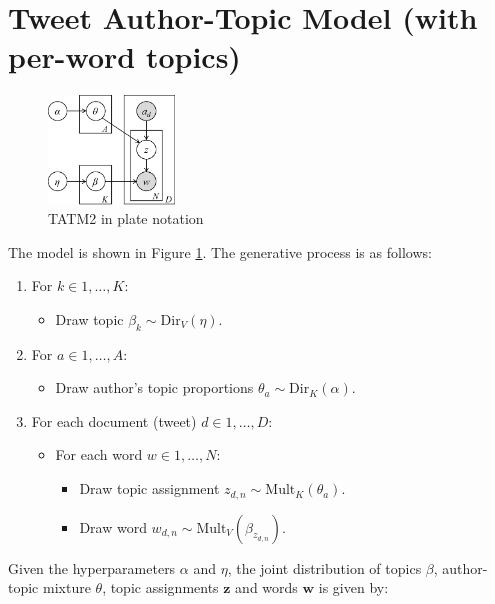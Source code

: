 \section{Tweet Author-Topic Model (with per-word topics)}

\begin{figure}[tb]
    \centering
    \includegraphics[width=0.3\textwidth]{TATM2.eps}
    \caption{TATM2 in plate notation}
    \label{fig:TATM2}
\end{figure}

The model is shown in Figure \ref{fig:TATM2}. The generative process is as follows:

\begin{enumerate}
	\item For $k \in {1, \ldots, K}$:
	\begin{itemize}
		\item Draw topic $\beta_k \sim \text{Dir}_V(\eta)$.
	\end{itemize}
	\item For $a \in {1, \ldots, A}$:
	\begin{itemize}
		\item Draw author's topic proportions $\theta_a \sim \text{Dir}_K(\alpha)$.
	\end{itemize}
  \item For each document (tweet) $d \in {1, \ldots, D}$:
	\begin{itemize}
		\item For each word $w \in {1, \ldots, N}$:
		\begin{itemize}
			\item Draw topic assignment $z_{d,n} \sim \text{Mult}_K(\theta_a)$.
			\item Draw word $w_{d,n} \sim \text{Mult}_V(\beta_{z_{d,n}})$.
		\end{itemize}
	\end{itemize}
\end{enumerate}


Given the hyperparameters $\alpha$ and $\eta$, the joint distribution of topics $\beta$, author-topic mixture $\theta$, topic assignments $\mathbf{z}$ and words $\mathbf{w}$ is given by:

